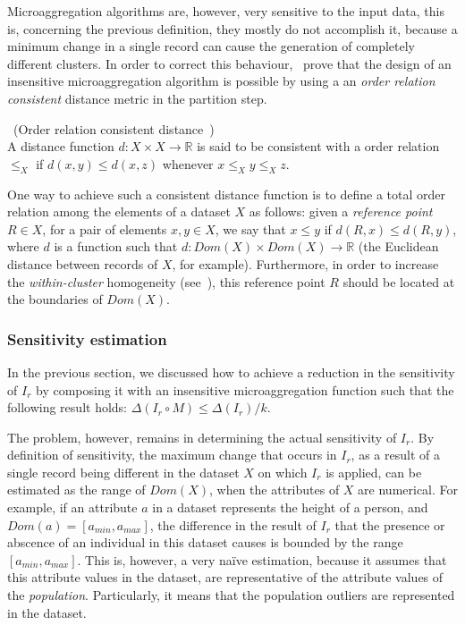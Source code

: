 Microaggregation algorithms are, however, very sensitive to the input data, this is, concerning the previous definition, they mostly do not accomplish it, because a minimum change in a single record can cause the generation of completely different clusters. In order to correct this behaviour,~\citet{Domingo:EnhancingDiffPrivMicroaggregation} prove that the design of an insensitive microaggregation algorithm is possible by using a an \textit{order relation consistent} distance metric in the partition step.

\begin{definition}~(Order relation consistent distance~\citep{Domingo:EnhancingDiffPrivMicroaggregation})\\
A distance function $d : X \times X \rightarrow \mathbb{R}$ is said to be consistent with a order relation $\leq_{X}$ if $d(x,y) \leq d(x,z)$ whenever $x \leq_{X} y \leq_{X} z$.
\end{definition}

One way to achieve such a consistent distance function is to define a total order relation among the elements of a dataset $X$ as follows: given a \textit{reference point} $R \in X$, for a pair of elements $x,y \in X$, we say that $x \leq y$ if $d(R,x) \leq d(R,y)$, where $d$ is a function such that $d : Dom(X) \times Dom(X) \rightarrow \mathbb{R}$ (the Euclidean distance between records of $X$, for example). Furthermore, in order to increase the \textit{within-cluster} homogeneity (see~), this reference point $R$ should be located at the boundaries of $Dom(X)$.

\subsubsection{Sensitivity estimation}
\label{Implementation:DifferentialPrivacy:Design:Sensitivity}

In the previous section, we discussed how to achieve a reduction in the sensitivity of $I_r$ by composing it with an insensitive microaggregation function such that the following result holds: $\Delta (I_r \circ M) \leq \Delta (I_r) / k$.

The problem, however, remains in determining the actual sensitivity of $I_r$. By definition of sensitivity, the maximum change that occurs in $I_r$, as a result of a single record being different in the dataset $X$ on which $I_r$ is applied, can be estimated as the range of $Dom(X)$, when the attributes of $X$ are numerical. For example, if an attribute $a$ in a dataset represents the height of a person, and $Dom(a) = [a_{min},a_{max}]$, the difference in the result of $I_r$ that the presence or abscence of an individual in this dataset causes is bounded by the range $[a_{min},a_{max}]$. This is, however, a very naïve estimation, because it assumes that this attribute values in the dataset, are representative of the attribute values of the \textit{population}. Particularly, it means that the population outliers are represented in the dataset.

